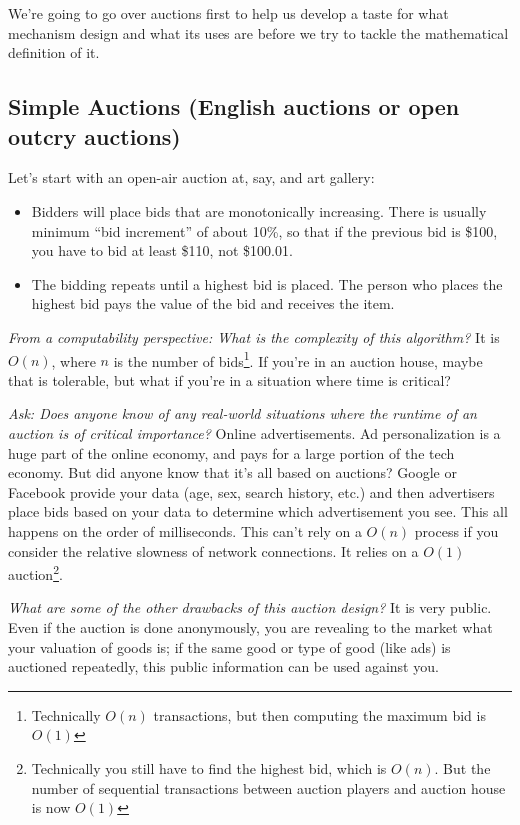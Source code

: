 \documentclass[11pt]{article}
\begin{document}
We're going to go over auctions first to help us develop a taste for what mechanism design and what its uses are before we try to tackle the mathematical definition of it. 

\subsection{Simple Auctions (English auctions or open outcry auctions)}

Let's start with an open-air auction at, say, and art gallery:
\begin{itemize}
    \item Bidders will place bids that are monotonically increasing. There is usually minimum ``bid increment'' of about 10\%, so that if the previous bid is \$100, you have to bid at least \$110, not \$100.01. 
    \item The bidding repeats until a highest bid is placed. The person who places the highest bid pays the value of the bid and receives the item.
\end{itemize}

{\it From a computability perspective: What is the complexity of this algorithm?} It is $O(n)$, where $n$ is the number of bids\footnote{Technically $O(n)$ transactions, but then computing the maximum bid is $O(1)$}. If you're in an auction house, maybe that is tolerable, but what if you're in a situation where time is critical? 

{\it Ask: Does anyone know of any real-world situations where the runtime of an auction is of critical importance?}
Online advertisements. Ad personalization is a huge part of the online economy, and pays for a large portion of the tech economy. But did anyone know that it's all based on auctions? Google or Facebook provide your data (age, sex, search history, etc.) and then advertisers place bids based on your data to determine which advertisement you see. This all happens on the order of milliseconds. This can't rely on a $O(n)$ process if you consider the relative slowness of network connections. It relies on a $O(1)$ auction\footnote{Technically you still have to find the highest bid, which is $O(n)$. But the number of sequential transactions between auction players and auction house is now $O(1)$}.

{\it What are some of the other drawbacks of this auction design?} It is very public. Even if the auction is done anonymously, you are revealing to the market what your valuation of goods is; if the same good or type of good (like ads) is auctioned repeatedly, this public information can be used against you. 
\end{document}
